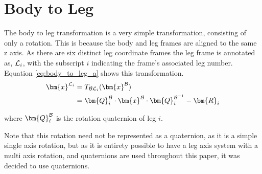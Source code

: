     \section{Body to Leg}
    The body to leg transformation is a very simple transformation, consisting of only a rotation. This is because
    the body and leg frames are aligned to the same z axis. As there are six distinct leg coordinate frames the leg frame is
    annotated as, \(\fleg\), with the subscript \(i\) indicating the frame's associated leg number. Equation \ref{eq:body_to_leg_a}
    shows this transformation.
    \begin{equation}\label{eq:body_to_leg_a}
        \begin{split}
            \bm{x}^\fleg &= \transframe{\bm{x}^\fbody}{\fbody}{\fleg} \\
            & = \bm{Q}_i^\fbody\cdot\bm{x}^\fbody\cdot\bm{Q}^{\fbody^{-1}}_{i} - \bm{R}_i
        \end{split}
        \end{equation}

    \noindent
    where \(\bm{Q}_i^\fbody\) is the rotation quaternion of leg \(i\).
    
    Note that this rotation need not be represented as a
    quaternion, as it is a simple single axis rotation, but as it is entirety possible to have a leg axis system with a multi axis
    rotation, and quaternions are used throughout this paper, it was decided to use quaternions.